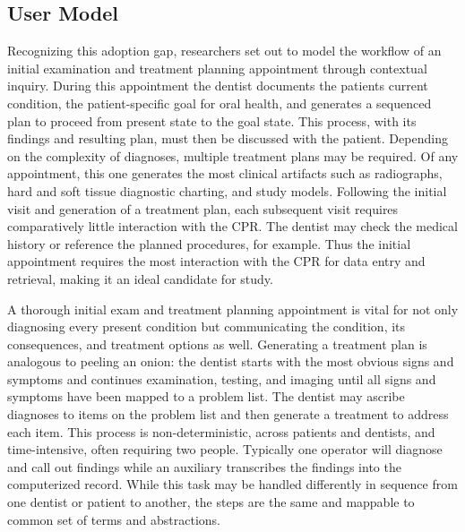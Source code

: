 \documentclass[11pt]{article}
\begin{document}
\subsection{User Model}
Recognizing this adoption gap, researchers set out to model the workflow of an initial examination and treatment planning appointment through contextual inquiry\cite{Irwin2009A-preliminary-m}. During this appointment the dentist documents the patients current condition, the patient-specific goal for oral health, and generates a sequenced plan to proceed from present state to the goal state. This process, with its findings and resulting plan, must then be discussed with the patient. Depending on the complexity of diagnoses, multiple treatment plans may be required. Of any appointment, this one generates the most clinical artifacts such as radiographs, hard and soft tissue diagnostic charting,  and study models. Following the initial visit and generation of a treatment plan, each subsequent visit requires comparatively little interaction with the CPR. The dentist may check the medical history or reference the planned procedures, for example. Thus the initial appointment requires the most interaction with the CPR for data entry and retrieval, making it an ideal candidate for study.

A thorough initial exam and treatment planning appointment is vital for not only diagnosing every present condition but communicating the condition, its consequences, and treatment options as well. Generating a treatment plan is analogous to peeling an onion: the dentist starts with the most obvious signs and symptoms and continues examination, testing, and imaging until all signs and symptoms have been mapped to a problem list. The dentist may ascribe diagnoses to items on the problem list and then generate a treatment to address each item. This process is non-deterministic, across patients and dentists, and time-intensive, often requiring two people. Typically one operator will diagnose and call out findings while an auxiliary transcribes the findings into the computerized record. While this task may be handled differently in sequence from one dentist or patient to another, the steps are the same and mappable to common set of terms and abstractions. 
\end{document}
